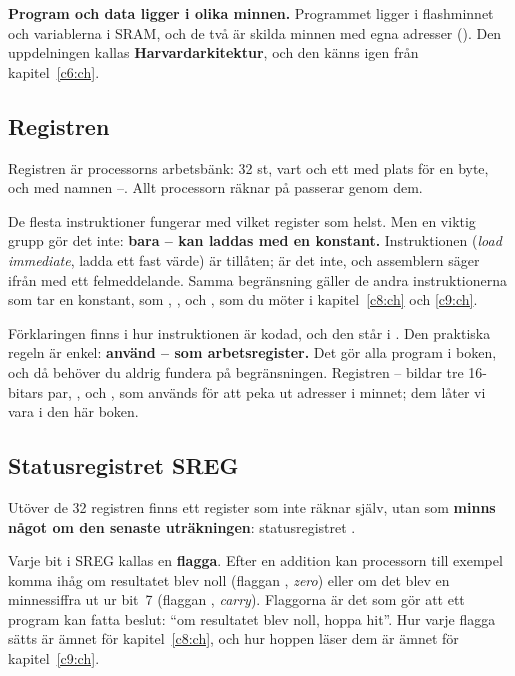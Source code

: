 \textbf{Program och data ligger i olika minnen.} Programmet ligger i flashminnet och variablerna i
SRAM, och de två är skilda minnen med egna adresser (). Den uppdelningen kallas
\textbf{Harvardarkitektur}, och den känns igen från kapitel~\ref{c6:ch}.

\subsection{Registren}
\label{c7:a2}
Registren är processorns arbetsbänk: 32 st, vart och ett med plats för en byte, och med namnen
--. Allt processorn räknar på passerar genom dem.


De flesta instruktioner fungerar med vilket register som helst. Men en viktig grupp gör det inte:
\textbf{bara -- kan laddas med en konstant.} Instruktionen 
(\emph{load immediate}, ladda ett fast värde) är tillåten;  är det inte, och
assemblern säger ifrån med ett felmeddelande. Samma begränsning gäller de andra instruktionerna som
tar en konstant, som , ,  och , som du möter i
kapitel~\ref{c8:ch} och \ref{c9:ch}.

Förklaringen finns i hur instruktionen är kodad, och den står i . Den praktiska
regeln är enkel: \textbf{använd -- som arbetsregister.} Det gör alla program i
boken, och då behöver du aldrig fundera på begränsningen. Registren -- bildar
tre 16-bitars par, ,  och , som används för att peka ut adresser i minnet;
dem låter vi vara i den här boken.

\subsection{Statusregistret SREG}
\label{c7:a3}
Utöver de 32 registren finns ett register som inte räknar själv, utan som \textbf{minns något om
den senaste uträkningen}: statusregistret .


Varje bit i SREG kallas en \textbf{flagga}. Efter en addition kan processorn till exempel komma
ihåg om resultatet blev noll (flaggan , \emph{zero}) eller om det blev en minnessiffra ut
ur bit~7 (flaggan , \emph{carry}). Flaggorna är det som gör att ett program kan fatta
beslut: \enquote{om resultatet blev noll, hoppa hit}. Hur varje flagga sätts är ämnet för
kapitel~\ref{c8:ch}, och hur hoppen läser dem är ämnet för kapitel~\ref{c9:ch}.

